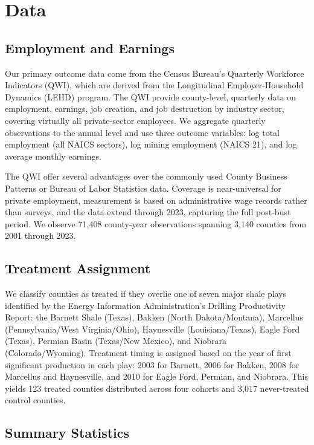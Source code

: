 \documentclass[12pt]{article}
\begin{document}
\section{Data}
\label{sec:data}

\subsection{Employment and Earnings}

Our primary outcome data come from the Census Bureau's Quarterly Workforce Indicators (QWI), which are derived from the Longitudinal Employer-Household Dynamics (LEHD) program. The QWI provide county-level, quarterly data on employment, earnings, job creation, and job destruction by industry sector, covering virtually all private-sector employees. We aggregate quarterly observations to the annual level and use three outcome variables: log total employment (all NAICS sectors), log mining employment (NAICS 21), and log average monthly earnings.

The QWI offer several advantages over the commonly used County Business Patterns or Bureau of Labor Statistics data. Coverage is near-universal for private employment, measurement is based on administrative wage records rather than surveys, and the data extend through 2023, capturing the full post-bust period. We observe 71,408 county-year observations spanning 3,140 counties from 2001 through 2023.

\subsection{Treatment Assignment}

We classify counties as treated if they overlie one of seven major shale plays identified by the Energy Information Administration's Drilling Productivity Report: the Barnett Shale (Texas), Bakken (North Dakota/Montana), Marcellus (Pennsylvania/West Virginia/Ohio), Haynesville (Louisiana/Texas), Eagle Ford (Texas), Permian Basin (Texas/New Mexico), and Niobrara (Colorado/Wyoming). Treatment timing is assigned based on the year of first significant production in each play: 2003 for Barnett, 2006 for Bakken, 2008 for Marcellus and Haynesville, and 2010 for Eagle Ford, Permian, and Niobrara. This yields 123 treated counties distributed across four cohorts and 3,017 never-treated control counties.

\subsection{Summary Statistics}
\end{document}
